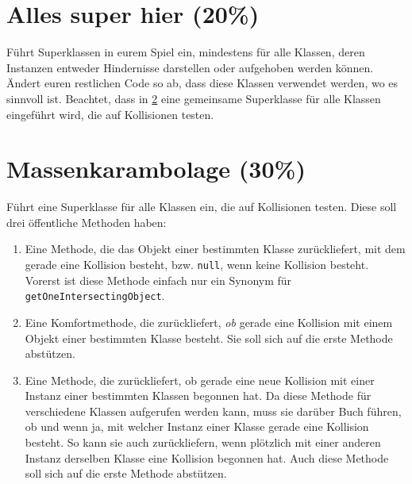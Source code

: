 \documentclass{../pi-aufgabenblatt}
\begin{document}

\section{Alles super hier (20\%)}

Führt Superklassen in eurem Spiel ein, mindestens für alle Klassen, deren Instanzen entweder Hindernisse darstellen oder aufgehoben werden können. Ändert euren restlichen Code so ab, dass diese Klassen verwendet werden, wo es sinnvoll ist. Beachtet, dass in \ref{s:collider} eine gemeinsame Superklasse für alle Klassen eingeführt wird, die auf Kollisionen testen.

\section{Massenkarambolage (30\%)}
\label{s:collider}

Führt eine Superklasse für alle Klassen ein, die auf Kollisionen testen. Diese soll drei öffentliche Methoden haben:

\begin{enumerate}

\item Eine Methode, die das Objekt einer bestimmten Klasse zurückliefert, mit dem gerade eine Kollision besteht, bzw. \texttt{null}, wenn keine Kollision besteht. Vorerst ist diese Methode einfach nur ein Synonym für \texttt{getOneIntersectingObject}. 

\item Eine Komfortmethode, die zurückliefert, \emph{ob} gerade eine Kollision mit einem Objekt einer bestimmten Klasse besteht. Sie soll sich auf die erste Methode abstützen.

\item Eine Methode, die zurückliefert, ob gerade eine neue Kollision mit einer Instanz einer bestimmten Klassen begonnen hat. Da diese Methode für verschiedene Klassen aufgerufen werden kann, muss sie darüber Buch führen, ob und wenn ja, mit welcher Instanz einer Klasse gerade eine Kollision besteht. So kann sie auch zurückliefern, wenn plötzlich mit einer anderen Instanz derselben Klasse eine Kollision begonnen hat. Auch diese Methode soll sich auf die erste Methode abstützen.

\end{enumerate}
\end{document}
